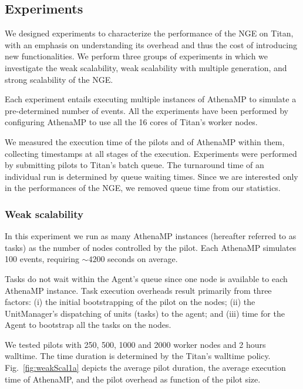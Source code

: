 \subsection{Experiments}\label{sec:ngeExp}

We designed experiments to characterize the performance of the NGE on Titan,
with an emphasis on understanding its overhead and thus the cost of
introducing new functionalities. We perform three groups of experiments in
which we investigate the weak scalability, weak scalability with multiple
generation, and strong scalability of the NGE\@.

Each experiment entails executing multiple instances of AthenaMP to simulate
a pre-determined number of events. All the experiments have been performed by
configuring AthenaMP to use all the 16 cores of Titan's worker nodes.

We measured the execution time of the pilots and of AthenaMP within them,
collecting timestamps at all stages of the execution. Experiments were
performed by submitting pilots to Titan's batch queue. The turnaround time of
an individual run is determined by queue waiting times. Since we are
interested only in the performances of the NGE, we removed queue time from
our statistics.

\subsubsection{Weak scalability}

In this experiment we run as many AthenaMP instances (hereafter referred to
as tasks) as the number of nodes controlled by the pilot. Each AthenaMP
simulates 100 events, requiring \(\sim 4200\) seconds on average.

Tasks do not wait within the Agent's queue since one node is available to
each AthenaMP instance. Task execution  overheads result primarily from three
factors: (i) the initial bootstrapping of the pilot on the nodes; (ii) the
UnitManager's dispatching of units (tasks) to the agent; and (iii) time for
the Agent to bootstrap all the tasks on the nodes.

We tested pilots with 250, 500, 1000 and 2000 worker nodes and 2 hours
walltime. The time duration is determined by the Titan's walltime policy.
Fig.~\ref{fig:weakScal1a} depicts the average pilot duration, the average
execution time of AthenaMP, and the pilot overhead as function of the pilot
size.

